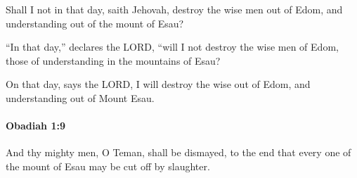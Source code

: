 			\begin{versebox}
					\item[BHS] 
					\item[LXX] 
					\item[ASV] Shall I not in that day, saith Jehovah, destroy the wise men out of Edom, and understanding out of the mount of Esau?
					\item[NIV] “In that day,” declares the LORD, “will I not destroy the wise men of Edom, those of understanding in the mountains of Esau?
					\item[NRSV] On that day, says the LORD, I will destroy the wise out of Edom, and understanding out of Mount Esau.
			\end{versebox}

		\paragraph{Obadiah 1:9} %
			\label{OBADIAH-1-9}

			And thy mighty men, O Teman, shall be dismayed, to the end that every one of the mount of Esau may be cut off by slaughter.

